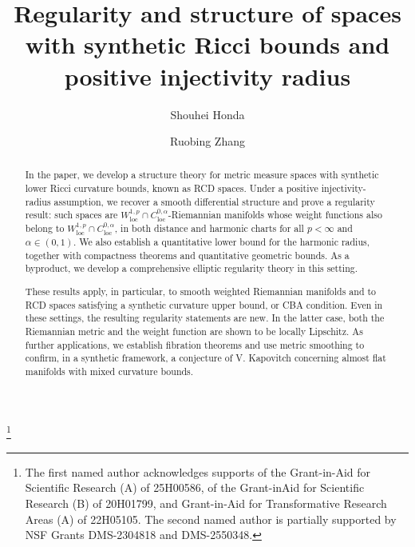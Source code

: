 \documentclass[11pt,reqno]{amsart}
\theoremstyle{definition}
\numberwithin{equation}{section}
\DeclareMathOperator{\loc}{loc}
\begin{document}
\title[Spaces with synthetic Ricci bounds and positive injectivity radius]{Regularity and structure of spaces with synthetic Ricci bounds and positive injectivity radius} 
 
\author{Shouhei Honda} 
\address{Graduate School of Mathematical Sciences
, University of Tokyo, Tokyo, 153-8914, Japan}

\author{Ruobing Zhang
} 
\address{Department of Mathematics, University of California, San Diego, 92093, USA}

   \thanks{The first named author acknowledges supports of the Grant-in-Aid for Scientific Research (A)
of 25H00586,
of the Grant-inAid for Scientific Research (B) of 20H01799, and Grant-in-Aid for Transformative Research Areas (A) of 22H05105. The second named author is partially supported by NSF Grants DMS-2304818 and DMS-2550348.}




\begin{abstract}
    In the paper, we develop a structure theory for metric measure spaces with synthetic lower Ricci curvature bounds, known as RCD spaces. 
    Under a positive injectivity-radius assumption, we recover a smooth differential structure and prove a regularity result: such spaces are $W^{1,p}_{\loc}\cap C^{0,\alpha}_{\loc}$-Riemannian manifolds whose weight functions also belong to $W^{1,p}_{\loc}\cap C^{0,\alpha}_{\loc}$, in both distance and harmonic charts for all $p<\infty$ and $\alpha \in (0,1)$. We also establish a quantitative lower bound for the harmonic radius, together with compactness theorems and quantitative geometric bounds. As a byproduct, we develop a comprehensive elliptic regularity theory in this setting.


    These results apply, in particular, to smooth weighted Riemannian manifolds and to RCD spaces satisfying a 
synthetic 
    curvature upper bound, or CBA condition. Even in these settings, the resulting regularity statements are new. In the latter case, both the Riemannian metric and the weight function are shown to be locally Lipschitz. As further applications, we establish fibration theorems and use metric smoothing to confirm, 
in a synthetic framework, a conjecture of V. Kapovitch concerning almost flat manifolds with mixed curvature bounds.
\end{abstract}


\maketitle
\end{document}
